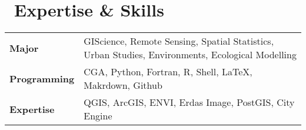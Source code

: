 \section{\texorpdfstring{\faLaptop\ Expertise \& Skills}{Expertise \& Skills}}
\begin{tabular}{p{} p{}}
\textbf{Major} & GIScience, Remote Sensing, Spatial Statistics, Urban Studies, Environments, Ecological Modelling\\
\textbf{Programming} & CGA, Python, Fortran, R, Shell, LaTeX, Makrdown, Github \\
\textbf{Expertise} & QGIS, ArcGIS, ENVI, Erdas Image, PostGIS, City Engine \\
\end{tabular}
